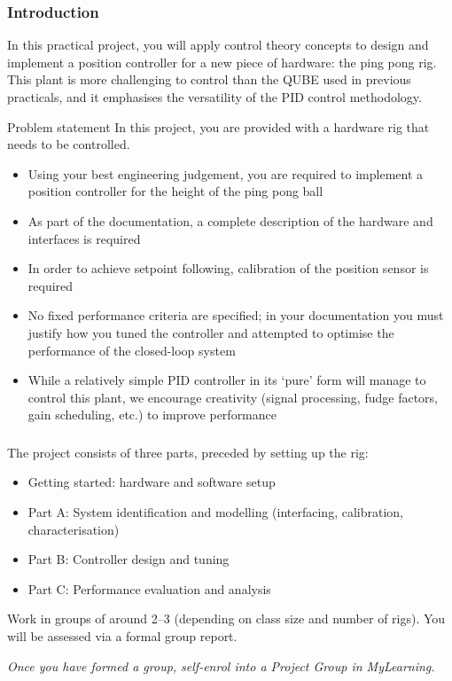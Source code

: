 \documentclass[9pt]{beamer-control}
\begin{document}

\begin{frame}
  \frametitle{Introduction}
  In this practical project, you will apply control theory concepts to design and implement a position controller for a new piece of hardware: the ping pong rig. This plant is more challenging to control than the QUBE used in previous practicals, and it emphasises the versatility of the PID control methodology.
\end{frame}



\begin{frame}{Problem statement}
  In this project, you are provided with a hardware rig that needs to be controlled.
  \begin{itemize}
    \item Using your best engineering judgement, you are required to implement a position controller for the height of the ping pong ball
    \item As part of the documentation, a complete description of the hardware and interfaces is required
    \item In order to achieve setpoint following, calibration of the position sensor is required
    \item No fixed performance criteria are specified; in your documentation you must justify how you tuned the controller and attempted to optimise the performance of the closed-loop system
    \item While a relatively simple PID controller in its `pure' form will manage to control this plant, we encourage creativity (signal processing, fudge factors, gain scheduling, etc.) to improve performance
  \end{itemize}
\end{frame}

\begin{frame}
  \frametitle{}
  The project consists of three parts, preceded by setting up the rig:
  \begin{itemize}
    \item Getting started: hardware and software setup
    \item Part A: System identification and modelling (interfacing, calibration, characterisation)
    \item Part B: Controller design and tuning
    \item Part C: Performance evaluation and analysis
  \end{itemize}
  Work in groups of around 2--3 (depending on class size and number of rigs). You will be assessed via a formal group report.

  \emph{Once you have formed a group, self-enrol into a Project Group in MyLearning. }
\end{frame}
\end{document}
